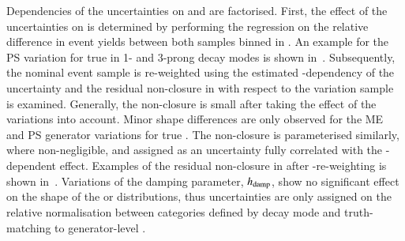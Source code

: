 Dependencies of the uncertainties on \tauhadvis \pT and \mTW are
factorised. First, the effect of the uncertainties on \tauhadvis \pT
is determined by performing the regression on the relative difference
in event yields between both samples binned in \tauhadvis \pT. An
example for the PS variation for true \tauhadvis in 1- and 3-prong
decay modes is shown
in~. Subsequently,
the nominal event sample is re-weighted using the estimated
\pT-dependency of the uncertainty and the residual non-closure in \mTW
with respect to the variation sample is examined. Generally, the
non-closure is small after taking the \tauhadvis \pT effect of the
variations into account. Minor shape differences are only observed for
the ME and PS generator variations for true \tauhadvis. The
non-closure is parameterised similarly, where non-negligible, and
assigned as an uncertainty fully correlated with the \pT-dependent
effect. Examples of the residual non-closure in \mTW after
\pT-re-weighting is shown
in~. Variations
of the damping parameter, $h_\mathrm{damp}$, show no significant effect on the
shape of the \tauhadvis \pT or \mTW distributions, thus uncertainties
are only assigned on the relative normalisation between categories
defined by \tauhadvis decay mode and truth-matching to generator-level
\tauhad.


